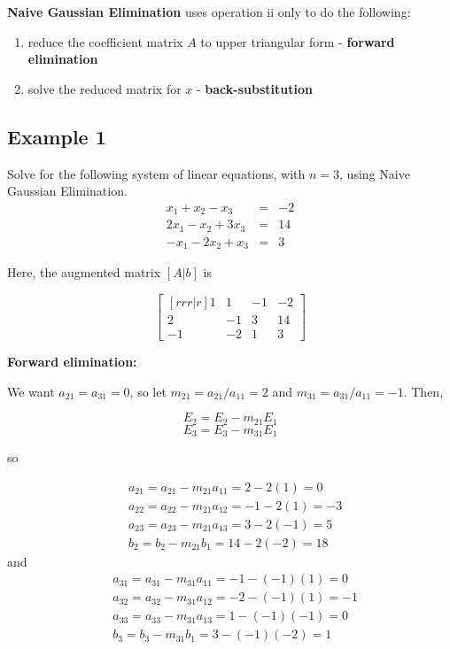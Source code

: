 \documentclass [titlepage,12pt,letter] {article}
\begin{document}
{\bf Naive Gaussian Elimination} uses operation ii only to do the following:
\begin{enumerate}
  \item reduce the coefficient matrix $A$ to upper triangular form - {\bf forward elimination}
  \item solve the reduced matrix for $x$ - {\bf back-substitution}
\end{enumerate}

 \subsection{Example 1}
Solve for the following system of linear equations, with $n=3$, using Naive Gaussian Elimination.
\begin{eqnarray*}
x_1+x_2-x_3 &=& -2\\
2x_1-x_2+3x_3 &=& 14 \\
-x_1-2x_2+x_3 &=& 3
\end{eqnarray*}

Here, the augmented matrix $[A|b]$ is

\[
\begin{bmatrix}[rrr|r]
    1 & 1 & -1 & -2 \\
    2 & -1 & 3 & 14 \\
    -1 & -2 & 1 & 3
\end{bmatrix}
\]

{\bf Forward elimination:}

We want $a_{21}=a_{31}=0$, so let $m_{21}=a_{21}/a_{11}=2$ and $m_{31}=a_{31}/a_{11}=-1$. Then,

\[
E_2=E_2-m_{21}E_1
\]
\[
E_3=E_3-m_{31}E_1
\]

so

\begin{align*} 
&a_{21}=a_{21}-m_{21}a_{11}=2-2(1)=0 \\
&a_{22}=a_{22}-m_{21}a_{12}=-1-2(1)=-3 \\
&a_{23}=a_{23}-m_{21}a_{13}=3-2(-1)=5 \\
&b_2=b_2-m_{21}b_1=14-2(-2)=18
\end{align*}
and
\begin{align*} 
&a_{31}=a_{31}-m_{31}a_{11}=-1-(-1)(1)=0 \\
&a_{32}=a_{32}-m_{31}a_{12}=-2-(-1)(1)=-1 \\
&a_{33}=a_{33}-m_{31}a_{13}=1-(-1)(-1)=0 \\
&b_3=b_3-m_{31}b_1=3-(-1)(-2)=1
\end{align*}
\end{document}
